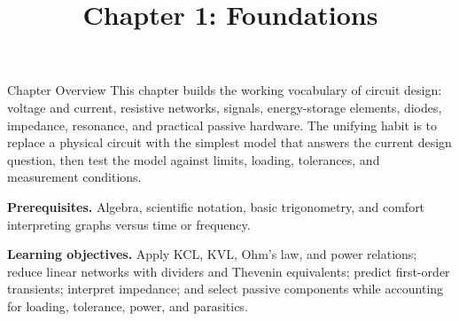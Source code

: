 \documentclass[10pt,letterpaper]{article}
\title{Chapter 1: Foundations}
\author{}
\date{}
\begin{document}
\maketitle

\begin{CornellOverviewBox}{Chapter Overview}
This chapter builds the working vocabulary of circuit design: voltage and current, resistive networks, signals, energy-storage elements, diodes, impedance, resonance, and practical passive hardware. The unifying habit is to replace a physical circuit with the simplest model that answers the current design question, then test the model against limits, loading, tolerances, and measurement conditions.

\textbf{Prerequisites.} Algebra, scientific notation, basic trigonometry, and comfort interpreting graphs versus time or frequency.

\textbf{Learning objectives.} Apply KCL, KVL, Ohm's law, and power relations; reduce linear networks with dividers and Thevenin equivalents; predict first-order transients; interpret impedance; and select passive components while accounting for loading, tolerance, power, and parasitics.
\end{CornellOverviewBox}
\end{document}

